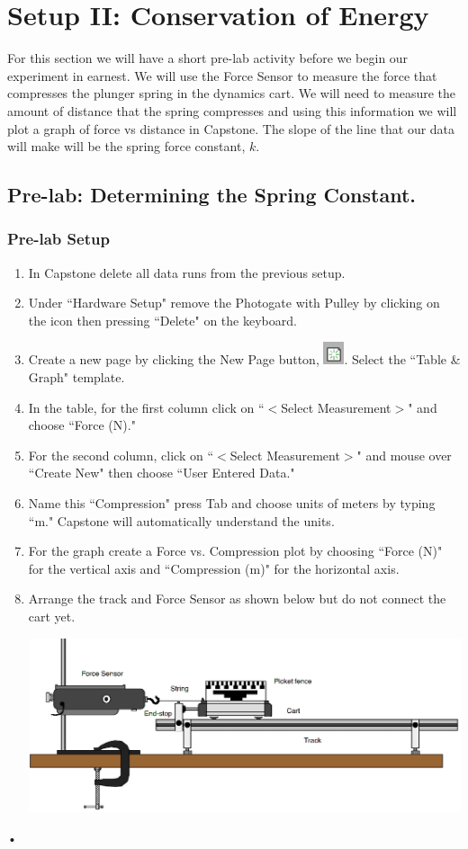 \documentclass[main.tex]{subfiles}
\begin{document}
\section{Setup II: Conservation of Energy}
For this section we will have a short pre-lab activity before we begin our experiment in earnest. We will use the Force Sensor to measure the force that compresses the plunger spring in the dynamics cart. We will need to measure the amount of distance that the spring compresses and using this information we will plot a graph of force vs distance in Capstone.  The slope of the line that our data will make will be the spring force constant, $k.$

\subsection*{Pre-lab: Determining the Spring Constant.}
\subsubsection*{Pre-lab Setup}
\begin{enumerate}
\item
In Capstone delete all data runs from the previous setup.
\item
Under ``Hardware Setup" remove the Photogate with Pulley by clicking on the icon then pressing ``Delete" on the keyboard.
\item
Create a new page by clicking the New Page button, \includegraphics{Add_Page}. Select the ``Table \& Graph" template.
\item
In the table, for the first column click on ``$<$Select Measurement$>$" and choose ``Force (N)."
\item
For the second column, click on ``$<$Select Measurement$>$" and mouse over ``Create New" then choose ``User Entered Data."
\item
Name this ``Compression" press Tab and choose units of meters by typing ``m." Capstone will automatically understand the units.
\item
For the graph create a Force vs. Compression plot by choosing ``Force (N)" for the vertical axis and ``Compression (m)" for the horizontal axis.
\item
Arrange the track and Force Sensor as shown below but do not connect the cart yet.

\includegraphics[width=\textwidth]{Energy_2_Prelab_Setup}
\end{enumerate}•
\end{document}
